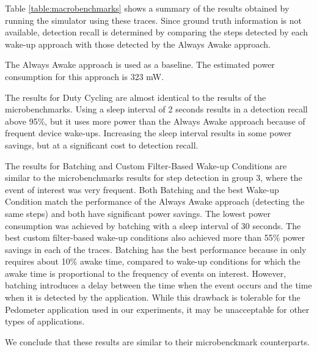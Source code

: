 Table \ref{table:macrobenchmarks} shows a summary of the results obtained by running the simulator using these traces. Since ground truth information is not available, detection recall is determined by comparing the steps detected by each wake-up approach with those detected by the Always Awake approach.

The Always Awake approach is used as a baseline. The estimated power consumption for this approach is 323 mW.

The results for Duty Cycling are almost identical to the results of the microbenchmarks. Using a sleep interval of 2 seconds results in a detection recall above 95\%, but it uses more power than the Always Awake approach because of frequent device wake-ups. Increasing the sleep interval results in some power savings, but at a significant cost to detection recall.

The results for Batching and Custom Filter-Based Wake-up Conditions are similar to the microbenchmarks results for step detection in group 3, where the event of interest was very frequent. Both Batching and the best Wake-up Condition match the performance of the Always Awake approach (detecting the same steps) and both have significant power savings. The lowest power consumption was achieved by batching with a sleep interval of 30 seconds. The best custom filter-based wake-up conditions also achieved more than 55\% power savings in each of the traces. Batching has the best performance because in only requires about 10\% awake time, compared to wake-up conditions for which the awake time is proportional to the frequency of events on interest. However, batching introduces a delay between the time when the event occurs and the time when it is detected by the application. While this drawback is tolerable for the Pedometer application used in our experiments, it may be unacceptable for other types of applications. 

We conclude that these results are similar to their microbenckmark counterparts.



